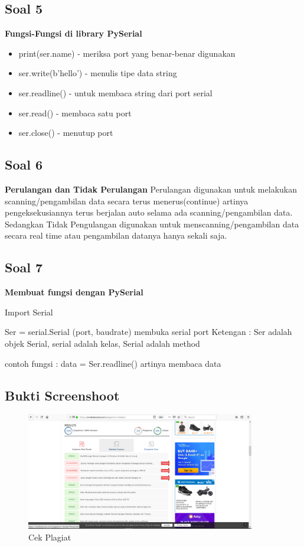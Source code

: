 \subsection{Soal 5}

\textbf{Fungsi-Fungsi di library PySerial}
\begin{itemize}
\item print(ser.name)         - meriksa port yang benar-benar digunakan
\item ser.write(b'hello')     	- menulis tipe data string
\item ser.readline()  	- untuk membaca string dari port serial
\item  ser.read()         	 - membaca satu port
\item ser.close()         	- menutup port
\end{itemize}

\subsection{Soal 6}

\textbf{Perulangan dan Tidak Perulangan}
	Perulangan digunakan untuk melakukan scanning/pengambilan data secara terus menerus(continue) artinya pengeksekusiannya terus berjalan auto selama ada scanning/pengambilan data. Sedangkan Tidak Pengulangan digunakan untuk menscanning/pengambilan data secara real time atau pengambilan datanya hanya sekali saja.


\subsection{Soal 7}

\textbf{Membuat fungsi dengan PySerial}


 Import Serial

Ser = serial.Serial (port, baudrate) membuka serial port
Ketengan : Ser adalah objek Serial, serial adalah kelas, Serial adalah method

contoh fungsi : data = Ser.readline() artinya membaca data


\subsection{Bukti Screenshoot}

\begin{figure}[H]
	\includegraphics[width=10cm]{figures/5/1174074/Teori/plagiarisme2.png}
	\centering	
	\caption{Cek Plagiat}
\end{figure}


